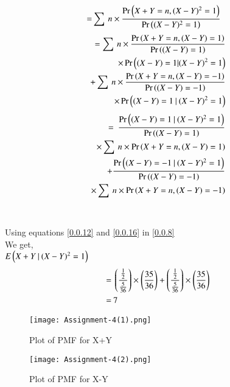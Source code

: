 \documentclass[journal,12pt,twocolumn]{IEEEtran}
\begin{document}
\begin{align}
    =&\sum\:n\times\frac{\Pr\left(X+Y=n,(X-Y)^2=1\right)}{\Pr\left((X-Y)^2=1\right)}
\end{align}
\begin{align}
    \begin{split}
        =\sum\:n\times\frac{\Pr\brak{X+Y=n,(X-Y)=1}}{\Pr\brak{(X-Y)=1}}
        \bigskip\\
        \times\Pr\brak{(X-Y)=1|(X-Y)^2=1}
        \bigskip\\
        +\sum\:n\times\frac{\Pr\brak{X+Y=n,(X-Y)=-1}}{\Pr\brak{(X-Y)=-1}}
        \bigskip\\
        \times\Pr\brak{(X-Y)=1\:|\:(X-Y)^2=1}
    \end{split}
\end{align}
\begin{align}
    \begin{split}
        =\:\frac{\Pr\brak{(X-Y)=1\:|\:(X-Y)^2=1}}{\Pr\brak{(X-Y)=1}}
        \bigskip\\
        \times\sum\:n\times\Pr\brak{X+Y=n,(X-Y)=1}
        \bigskip\\
        +\frac{\Pr\brak{(X-Y)=-1\:|\:(X-Y)^2=1}}{\Pr\brak{(X-Y)=-1}}
        \bigskip\\
        \times\sum\:n\times\Pr\brak{X+Y=n,(X-Y)=-1}\label{0.0.8}
    \end{split}
\end{align}
\newline\\
\\Using equations \eqref{0.0.12} and \eqref{0.0.16} in \eqref{0.0.8}\\
We get,\\
$E\left(X+Y\:|\:(X-Y)^2=1\right)$
\begin{align}
    =&\:\left(\frac{\frac{1}{2}}{\frac{5}{36}}\right)\times\left(\frac{35}{36}\right)+\left(\frac{\frac{1}{2}}{\frac{5}{36}}\right)\times\left(\frac{35}{36}\right)\\
    =&\:7
\end{align}
\begin{figure}[htb]
    \texttt{[image: Assignment-4(1).png]}
    \caption{Plot of PMF for X+Y}
\end{figure}
\begin{figure}[htb]
    \texttt{[image: Assignment-4(2).png]}
    \caption{Plot of PMF for X-Y}
\end{figure}
\end{document}

